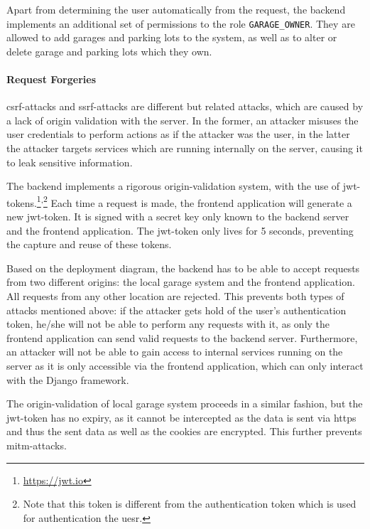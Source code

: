 \ind Apart from determining the user automatically from the request, the backend implements an additional set of permissions to the role \verb+GARAGE_OWNER+. They are allowed to add garages and parking lots to the system, as well as to alter or delete garage and parking lots which they own.


\paragraph{Request Forgeries}
\ac{csrf}-attacks and \ac{ssrf}-attacks are different but related attacks, which are caused by a lack of origin validation with the server. In the former, an attacker misuses the user credentials to perform actions as if the attacker was the user, in the latter the attacker targets services which are running internally on the server, causing it to leak sensitive information.

\ind The backend implements a rigorous origin-validation system, with the use of \ac{jwt}-tokens.\footnote{\url{https://jwt.io}}\textsuperscript{,}\footnote{Note that this token is different from the authentication token which is used for authentication the uesr.} Each time a request is made, the frontend application will generate a new \ac{jwt}-token. It is signed with a secret key only known to the backend server and the frontend application. The \ac{jwt}-token only lives for 5 seconds, preventing the capture and reuse of these tokens. 

\ind Based on the deployment diagram, the backend has to be able to accept requests from two different origins: the local garage system and the frontend application. All requests from any other location are rejected. This prevents both types of attacks mentioned above: if the attacker gets hold of the user's authentication token, he/she will not be able to perform any requests with it, as only the frontend application can send valid requests to the backend server. Furthermore, an attacker will not be able to gain access to internal services running on the server as it is only accessible via the frontend application, which can only interact with the Django framework.

\ind The origin-validation of local garage system proceeds in a similar fashion, but the \ac{jwt}-token has no expiry, as it cannot be intercepted as the data is sent via \ac{https} and thus the sent data as well as the cookies are encrypted. This further prevents \ac{mitm}-attacks.

